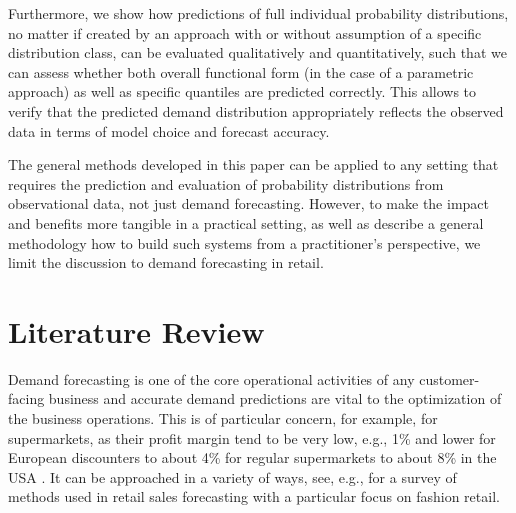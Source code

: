 \documentclass[BCOR=1mm, DIV=calc,10pt,
twoside=true,
twocolumn,
headings=normal]{scrartcl}
\begin{document}
Furthermore, we show how predictions of full individual probability distributions, no matter if created by an approach with or without assumption of a specific distribution class, can be evaluated qualitatively and quantitatively, such that we can assess whether both overall functional form (in the case of a parametric approach) as well as specific quantiles are predicted correctly. This allows to verify that the predicted demand distribution appropriately reflects the observed data in terms of model choice and forecast accuracy.

The general methods developed in this paper can be applied to any setting that requires the prediction and evaluation of probability distributions from observational data, not just demand forecasting. However, to make the impact and benefits more tangible in a practical setting, as well as describe a general methodology how to build such systems from a practitioner's perspective, we limit the discussion to demand forecasting in retail.


\section{Literature Review}
\label{sec:LitRev}

Demand forecasting is one of the core operational activities of any customer-facing business and accurate demand predictions are vital to the optimization of the business operations. This is of particular concern, for example, for supermarkets, as their profit margin tend to be very low, e.g., 1\% and lower for European discounters \cite{MarginLidlSweden} to about 4\% for regular supermarkets \cite{MarginWillysSweden,MarginHemkopSweden} to about 8\% in the USA \cite{MarginPublixUSA}. It can be approached in a variety of ways, see, e.g., \cite{beheshti2015survey} for a survey of methods used in retail sales forecasting with a particular focus on fashion retail.
\end{document}
